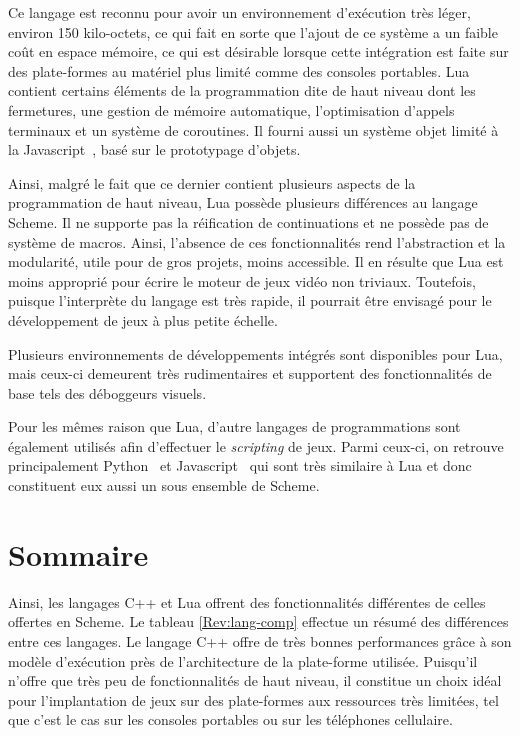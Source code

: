 \documentclass[12pt,twoside,letterpaper,francais]{book}
\begin{document}
Ce langage est reconnu pour avoir un environnement d'exécution très
léger, environ 150 kilo-octets, ce qui fait en sorte que l'ajout de ce
système a un faible coût en espace mémoire, ce qui est désirable
lorsque cette intégration est faite sur des plate-formes au matériel
plus limité comme des consoles portables. Lua contient certains
éléments de la programmation dite de haut niveau dont les fermetures,
une gestion de mémoire automatique, l'optimisation d'appels terminaux
et un système de coroutines. Il fourni aussi un système objet limité
à la Javascript~\cite{ECMA-262}, basé sur le prototypage d'objets.

Ainsi, malgré le fait que ce dernier contient plusieurs aspects de la
programmation de haut niveau, Lua possède plusieurs différences au
langage Scheme. Il ne supporte pas la réification de
continuations et ne possède pas de système de macros. Ainsi, l'absence
de ces fonctionnalités rend l'abstraction et la modularité, utile pour
de gros projets, moins accessible. Il en résulte que Lua est moins
approprié pour écrire le moteur de jeux vidéo non triviaux. Toutefois,
puisque l'interprète du langage est très rapide, il pourrait être
envisagé pour le dévelop\-pement de jeux à plus petite échelle.

Plusieurs environnements de développements intégrés sont disponibles
pour Lua, mais ceux-ci demeurent très rudimentaires et supportent des
fonctionnalités de base tels des déboggeurs visuels. 

Pour les mêmes raison que Lua, d'autre langages de programmations sont
également utilisés afin d'effectuer le \textit{scripting} de
jeux. Parmi ceux-ci, on retrouve principalement Python~\cite{Python}
et Javascript~\cite{ECMA-262} qui sont très similaire à Lua et donc
constituent eux aussi un sous ensemble de Scheme.


\FloatBarrier
\section{Sommaire}
Ainsi, les langages C++ et Lua offrent des fonctionnalités différentes
de celles offertes en Scheme. Le tableau \ref{Rev:lang-comp} effectue
un résumé des différences entre ces langages. Le langage C++ offre de
très bonnes performances grâce à son modèle d'exécution près de
l'architecture de la plate-forme utilisée. Puisqu'il n'offre que très
peu de fonctionnalités de haut niveau, il constitue un choix idéal
pour l'implantation de jeux sur des plate-formes aux ressources très
limitées, tel que c'est le cas sur les consoles portables ou sur les
téléphones cellulaire.
\end{document}
